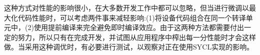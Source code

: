 这种方式对性能的影响很小，在大多数开发工作中都可以忽略，但当进行微调以最大化代码性能时，可以考虑两件事来减轻影响:(1)将设备代码组合在同一个转译单元中，(2)使用提前编译来完全避免即时编译效应。由于这两种方法都需要付出一定的努力，所以只有在完成开发，并试图从应用程序中榨出每一分性能时才会这样做。当采用这种调优时，有必要进行测试，以观察对正在使用SYCL实现的影响。\par











































